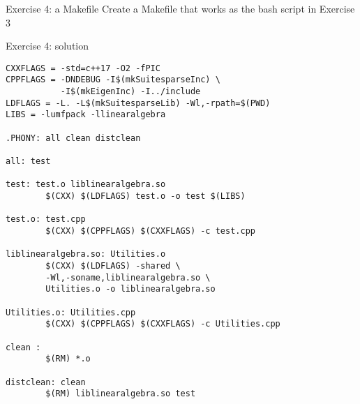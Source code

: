 \documentclass[10pt]{beamer}
\begin{document}
\begin{frame}{Exercise 4: a Makefile}
Create a Makefile that works as the bash script in Exercise 3
\end{frame}

\begin{frame}{Exercise 4: solution}
\begin{verbatim}
CXXFLAGS = -std=c++17 -O2 -fPIC
CPPFLAGS = -DNDEBUG -I$(mkSuitesparseInc) \
           -I$(mkEigenInc) -I../include
LDFLAGS = -L. -L$(mkSuitesparseLib) -Wl,-rpath=$(PWD)
LIBS = -lumfpack -llinearalgebra

.PHONY: all clean distclean

all: test

test: test.o liblinearalgebra.so
        $(CXX) $(LDFLAGS) test.o -o test $(LIBS)

test.o: test.cpp
        $(CXX) $(CPPFLAGS) $(CXXFLAGS) -c test.cpp

liblinearalgebra.so: Utilities.o
        $(CXX) $(LDFLAGS) -shared \
        -Wl,-soname,liblinearalgebra.so \
        Utilities.o -o liblinearalgebra.so

Utilities.o: Utilities.cpp
        $(CXX) $(CPPFLAGS) $(CXXFLAGS) -c Utilities.cpp

clean :
        $(RM) *.o 

distclean: clean
        $(RM) liblinearalgebra.so test
\end{verbatim}
\end{frame}
\end{document}
